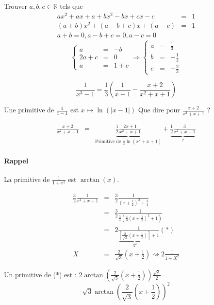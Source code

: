 			Trouver $a, b, c \in \mathbb{R}$ tels que \[\begin{array}{rcl}
					ax^2 + ax + a + bx^2 - bx + cx - c &=& 1 \\
					(a+b)x^2 + (a-b+c)x + (a-c) &=& 1 \\
				a+b = 0, a-b+c = 0, a-c = 0\end{array}
			\]
			\[\left\{\begin{array}{rcl}
						a &=& -b \\
						2a + c &=& 0 \\
					a&=& 1 + c \end{array}\right.
						\Rightarrow \left\{\begin{array}{rcl}
								a&=& \frac{1}{3} \\
								b &=& -\frac{1}{3} \\
						c &=& - \frac{2}{3}\end{array}\right.\]

								\[\frac{1}{x^3 -1} = \frac{1}{3}(\frac{1}{x-1} - \frac{x+2}{x^2 +x + 1})\]

Une primitive de $\frac{1}{x-1}$ est $x \mapsto \ln(|x-1|)$
Que dire pour $\frac{x+2}{x^2 + x + 1}$ ? 

\[\begin{array}{rcl}
\frac{x+2}{x^2 + x + 1} &=& \underbrace{\frac{1}{2}\frac{2x+1}{x^2 + x + 1}}_{\text{Primitive de } \frac{1}{2} \ln(x^2 + x + 1)} + \underbrace{\frac{1}{2} \frac{3}{x^2 + x + 1} }_{\text{?}}\end{array}\]

		\paragraph{Rappel} La primitive de $\frac{1}{1+x^2}$ est $\arctan (x)$.

		\[\begin{array}{rcl}
				\frac{3}{2}\frac{1}{x^2 + x + 1} &=& \frac{3}{2}\frac{1}{(x+\frac{1}{2})^2 + \frac{3}{4}} \\
									   &=& \frac{3}{2} \frac{1}{\frac{3}{4}(\frac{4}{3}(x+\frac{1}{2})^2 + 1)} \\
									   &=& 2\frac{1}{\underbrace{[\frac{2}{\sqrt{3}}(x+\frac{1}{2})]}_{X^2} + 1} (*)\\
				X &=& \frac{2}{\sqrt{3}}(x+\frac{1}{2}) \rightsquigarrow 2\frac{1}{1+X^2}
		\end{array}\]

		Un primitive de (*) est : $2\arctan (\frac{2}{\sqrt{3}}(x+\frac{1}{2})) \frac{\sqrt{3}}{2}$ ~\\
		\[\sqrt{3}\arctan(\frac{2}{\sqrt{3}}(x+\frac{1}{2}))^2\]
